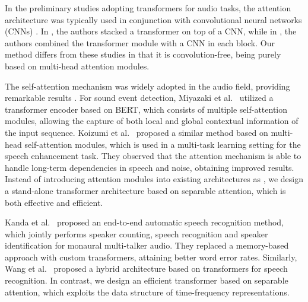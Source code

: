 \documentclass[a4paper]{article}
\begin{document}
In the preliminary studies adopting transformers for audio tasks, the attention architecture was typically used in conjunction with convolutional neural networks (CNNs) \cite{Miyazaki-DCASE-2020, Kong-TASLP-2020, Gulati-INTERSPEECH-2020}. In \cite{Miyazaki-DCASE-2020, Kong-TASLP-2020}, the authors stacked a transformer on top of a CNN, while in \cite{Gulati-INTERSPEECH-2020}, the authors combined the transformer module with a CNN in each block. Our method differs from these studies in that it is convolution-free, being purely based on multi-head attention modules. 

The self-attention mechanism was widely adopted in the audio field, providing remarkable results \cite{Miyazaki-ICASSP-2020, Koizumi-ICASSP-2020}. For sound event detection, Miyazaki et al.~\cite{Miyazaki-ICASSP-2020} utilized a transformer encoder based on BERT, which consists of multiple self-attention modules, allowing the capture of both local and global contextual information of the input sequence. Koizumi et al.~\cite{Koizumi-ICASSP-2020} proposed a similar method based on multi-head self-attention modules, which is used in a multi-task learning setting for the speech enhancement task. They observed that the attention mechanism is able to handle long-term dependencies in speech and noise, obtaining improved results. Instead of introducing attention modules into existing architectures as \cite{Miyazaki-ICASSP-2020, Koizumi-ICASSP-2020}, we design a stand-alone transformer architecture based on separable attention, which is both effective and efficient.

Kanda et al.~\cite{Kanda-INTERSPEECH-2021} proposed an end-to-end automatic speech recognition method, which jointly performs speaker counting, speech recognition and speaker identification for monaural multi-talker audio. They replaced a memory-based approach with custom transformers, attaining better word error rates. Similarly, Wang et al.~\cite{Wang-ICASSP-2020} proposed a hybrid architecture based on transformers for speech recognition. In contrast, we design an efficient transformer based on separable attention, which exploits the data structure of time-frequency representations.
\end{document}
